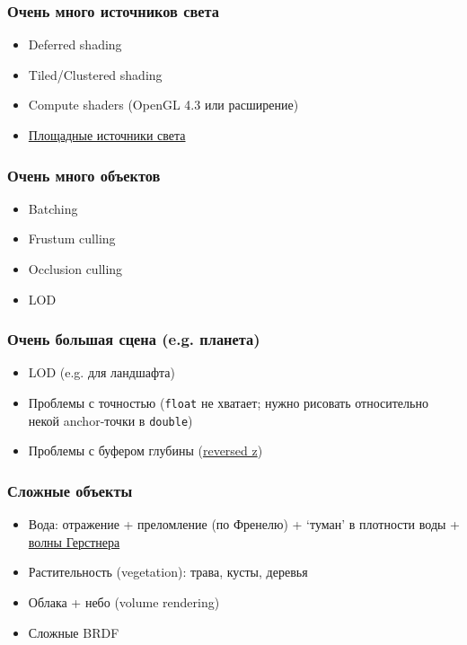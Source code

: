 \documentclass{beamer}
\begin{document}
\begin{frame}[fragile]
\frametitle{Очень много источников света}
\begin{itemize}
\item Deferred shading
\item Tiled/Clustered shading
\item Compute shaders (OpenGL 4.3 или расширение)
\item \href{https://learnopengl.com/Guest-Articles/2022/Area-Lights}{Площадные источники света}
\end{itemize}
\end{frame}

\begin{frame}[fragile]
\frametitle{Очень много объектов}
\begin{itemize}
\item Batching
\item Frustum culling
\item Occlusion culling
\item LOD
\end{itemize}
\end{frame}

\begin{frame}[fragile]
\frametitle{Очень большая сцена (e.g. планета)}
\begin{itemize}
\item LOD (e.g. для ландшафта)
\item Проблемы с точностью (\verb|float| не хватает; нужно рисовать относительно некой anchor-точки в \verb|double|)
\item Проблемы с буфером глубины (\href{https://nlguillemot.wordpress.com/2016/12/07/reversed-z-in-opengl/}{reversed z})
\end{itemize}
\end{frame}

\begin{frame}[fragile]
\frametitle{Сложные объекты}
\begin{itemize}
\item Вода: отражение + преломление (по Френелю) + `туман' в плотности воды + \href{https://en.wikipedia.org/wiki/Trochoidal_wave}{волны Герстнера}
\item Растительность (vegetation): трава, кусты, деревья
\item Облака + небо (volume rendering)
\item Сложные BRDF
\end{itemize}
\end{frame}
\end{document}
